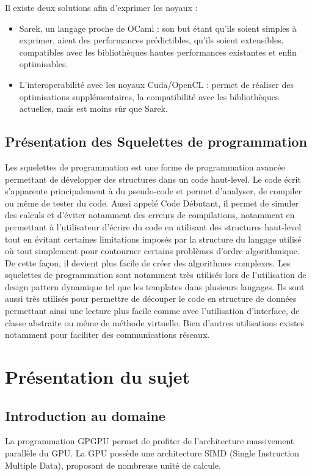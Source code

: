\documentclass{report}
\begin{document}
Il existe deux solutions afin d’exprimer les noyaux :
\begin{itemize}

\item Sarek, un langage proche de OCaml : son but étant qu’ils soient simples à exprimer, aient des performances prédictibles, qu’ils soient extensibles, compatibles avec les bibliothèques hautes performances existantes et enfin optimisables.
\item L’interoperabilité avec les noyaux Cuda/OpenCL : permet de réaliser des optimisations supplémentaires, la compatibilité avec les bibliothèques actuelles, mais est moins sûr que Sarek.

\end{itemize}

\section{Présentation des Squelettes de programmation}
Les squelettes de programmation est une forme de programmation avancée permettant de développer des structures dans un code haut-level. Le code écrit s’apparente principalement  à du pseudo-code et permet d’analyser, de compiler ou même de tester du code. Aussi appelé Code Débutant, il permet de simuler des calculs et d’éviter notamment des erreurs de compilations, notamment en permettant à l’utilisateur d’écrire du code en utilisant des structures haut-level tout en évitant certaines limitations imposés par la structure du langage utilisé où tout simplement pour contourner certains problèmes d’ordre algorithmique. De cette façon, il devient plus facile de créer des algorithmes complexes.
Les squelettes de programmation sont notamment très utilisés lors de l’utilisation de design pattern dynamique tel que les templates dans plusieurs langages. Ils sont aussi très utilisés pour permettre de découper le code en structure de données permettant ainsi une lecture plus facile comme avec l’utilisation d'interface, de classe abstraite ou même de méthode virtuelle. Bien d’autres utilisations existes notamment pour faciliter des communications réseaux.

\chapter{Présentation du sujet}

\section{Introduction au domaine}
La programmation GPGPU permet de profiter de l’architecture massivement parallèle du GPU. La GPU possède une architecture SIMD (Single Instruction Multiple Data), proposant de nombreuse unité de calcule. 
\end{document}
